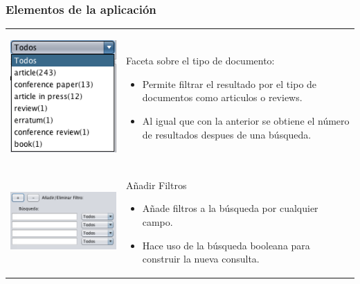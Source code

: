 \documentclass{beamer} %
\begin{document}
\begin{frame}
	\frametitle{Elementos de la aplicación}
	\begin{tabular}{cl}
		\begin{minipage}{0.33\textwidth}	
			\begin{center}
					\includegraphics[scale=0.35]{Img/Img8.png}
			\end{center}
		\end{minipage}
 	 & 
		\begin{minipage}[t]{0.65\textwidth}
		Faceta sobre el tipo de documento:
    	\begin{itemize}
    		\item Permite filtrar el resultado por el tipo de documentos como articulos o reviews.
    		\item Al igual que con la anterior se obtiene el número de resultados despues de una búsqueda.
    	\end{itemize}
 	 \end{minipage}\\
		\begin{minipage}{0.33\textwidth}	
			\begin{center}
					\includegraphics[scale=0.35]{Img/Img9.png}
			\end{center}		
		\end{minipage}  
	& 
	\begin{minipage}[t]{0.6\textwidth}
	Añadir Filtros
    	\begin{itemize}
    		\item Añade filtros a la búsqueda por cualquier campo.
    		\item Hace uso de la búsqueda booleana para construir la nueva consulta.
    	\end{itemize}
 	 \end{minipage}\\
	\end{tabular} 
\end{frame}
\end{document}
